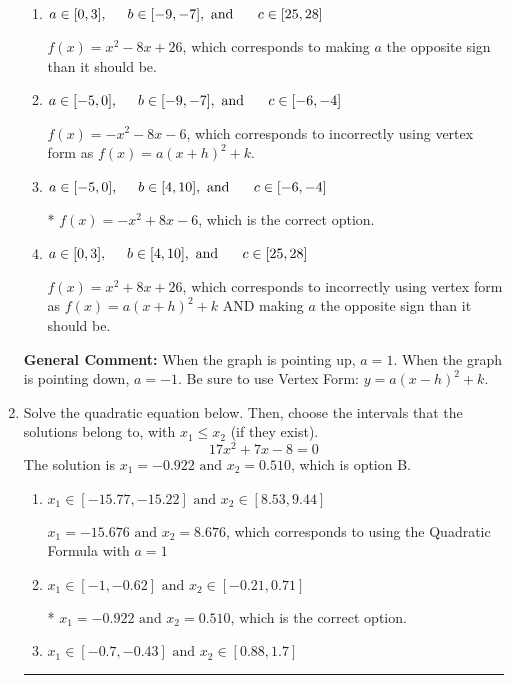 \documentclass{extbook}[14pt]
\newcommand{\litem}[1]{\item #1

\rule{\textwidth}{0.4pt}}
\begin{document}
\begin{enumerate}
{\begin{enumerate}[label=\Alph*.]
$f(x)=-x^{2} -8 x -26$, which corresponds to incorrectly using vertex form as $f(x) = a(x+h)^2 - k$.
\item \( a \in [0, 3], \hspace*{5mm} b \in [-9, -7], \text{ and } \hspace*{5mm} c \in [25, 28] \)

$f(x)=x^{2} -8 x + 26$, which corresponds to making $a$ the opposite sign than it should be.
\item \( a \in [-5, 0], \hspace*{5mm} b \in [-9, -7], \text{ and } \hspace*{5mm} c \in [-6, -4] \)

$f(x)=-x^{2} -8 x -6$, which corresponds to incorrectly using vertex form as $f(x) = a(x+h)^2+k$.
\item \( a \in [-5, 0], \hspace*{5mm} b \in [4, 10], \text{ and } \hspace*{5mm} c \in [-6, -4] \)

* $f(x)=-x^{2} +8 x -6$, which is the correct option.
\item \( a \in [0, 3], \hspace*{5mm} b \in [4, 10], \text{ and } \hspace*{5mm} c \in [25, 28] \)

$f(x)=x^{2} +8 x + 26$, which corresponds to incorrectly using vertex form as $f(x) = a(x+h)^2+k$ AND making $a$ the opposite sign than it should be.
\end{enumerate}

\textbf{General Comment:} When the graph is pointing up, $a=1$. When the graph is pointing down, $a=-1$. Be sure to use Vertex Form: $y = a(x-h)^2+k$.
}
\litem{
Solve the quadratic equation below. Then, choose the intervals that the solutions belong to, with $x_1 \leq x_2$ (if they exist).
\[ 17x^{2} +7 x -8 = 0 \]The solution is \( x_1 = -0.922 \text{ and } x_2 = 0.510 \), which is option B.\begin{enumerate}[label=\Alph*.]
\item \( x_1 \in [-15.77, -15.22] \text{ and } x_2 \in [8.53, 9.44] \)

 $x_1 = -15.676 \text{ and } x_2 = 8.676$, which corresponds to using the Quadratic Formula with $a=1$
\item \( x_1 \in [-1, -0.62] \text{ and } x_2 \in [-0.21, 0.71] \)

* $x_1 = -0.922 \text{ and } x_2 = 0.510$, which is the correct option.
\item \( x_1 \in [-0.7, -0.43] \text{ and } x_2 \in [0.88, 1.7] \)


\end{enumerate}}
\end{enumerate}
\end{document}
